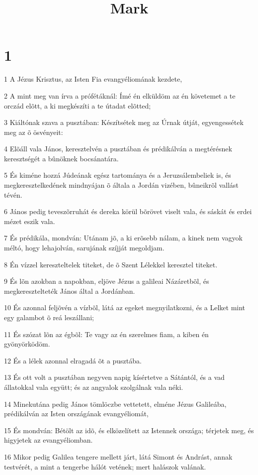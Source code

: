 

\title{Mark}


\chapter{1}

\par 1 A Jézus Krisztus, az Isten Fia evangyéliomának kezdete,
\par 2 A mint meg van írva a prófétáknál: Ímé én elküldöm az én követemet a te orczád elõtt, a ki megkészíti a te útadat elõtted;
\par 3 Kiáltónak szava a pusztában: Készítsétek meg az Úrnak útját, egyengessétek meg az õ ösvényeit:
\par 4 Elõáll vala János, keresztelvén a pusztában és prédikálván a megtérésnek keresztségét a bûnöknek bocsánatára.
\par 5 És kiméne hozzá Júdeának egész tartománya és a Jeruzsálembeliek is, és megkeresztelkedének mindnyájan õ általa a Jordán vizében, bûneikrõl vallást tévén.
\par 6 János pedig teveszõrruhát és dereka körül bõrövet viselt vala, és sáskát és erdei mézet eszik vala.
\par 7 És prédikála, mondván: Utánam jõ, a ki erõsebb nálam, a kinek nem vagyok méltó, hogy lehajolván, sarujának szíjját megoldjam.
\par 8 Én vízzel kereszteltelek titeket, de õ Szent Lélekkel keresztel titeket.
\par 9 És lõn azokban a napokban, eljöve Jézus a galileai Názáretbõl, és megkeresztelteték János által a Jordánban.
\par 10 És azonnal feljõvén a vízbõl, látá az egeket megnyilatkozni, és a Lelket mint egy galambot õ reá leszállani;
\par 11 És szózat lõn az égbõl: Te vagy az én szerelmes fiam, a kiben én gyönyörködöm.
\par 12 És a lélek azonnal elragadá õt a pusztába.
\par 13 És ott volt a pusztában negyven napig kísértetve a Sátántól, és a vad állatokkal vala együtt; és az angyalok szolgálnak vala néki.
\par 14 Minekutána pedig János tömlöczbe vettetett, elméne Jézus Galileába, prédikálván az Isten országának evangyéliomát,
\par 15 És mondván: Bétölt az idõ, és elközelített az Istennek országa; térjetek meg, és higyjetek az evangyéliomban.
\par 16 Mikor pedig Galilea tengere mellett járt, látá Simont és Andrást, annak testvérét, a mint a tengerbe hálót vetének; mert halászok valának.
